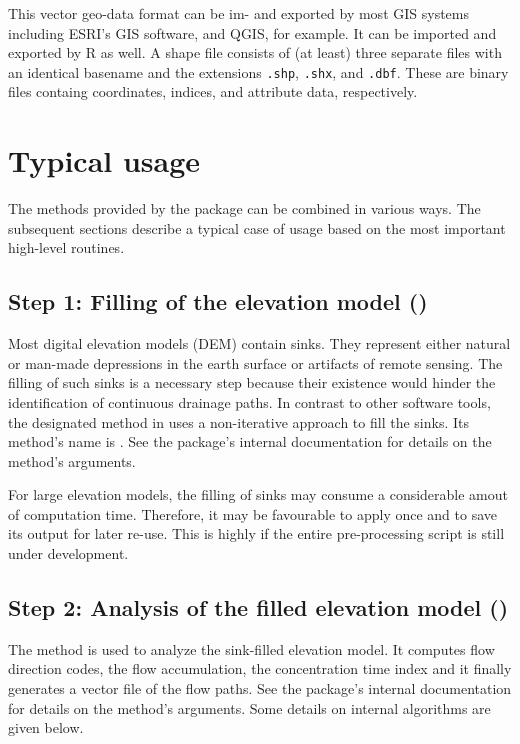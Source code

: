 This vector geo-data format can be im- and exported by most GIS systems including ESRI's GIS software, and QGIS, for example. It can be imported and exported by R as well. A shape file consists of (at least) three separate files with an identical basename and the extensions \texttt{.shp}, \texttt{.shx}, and \texttt{.dbf}. These are binary files containg coordinates, indices, and attribute data, respectively.

\section{Typical usage} \label{sec:topocatch:usage}

The methods provided by the  package can be combined in various ways. The subsequent sections describe a typical case of usage based on the most important high-level routines.

\subsection{Step 1: Filling of the elevation model ()}
Most digital elevation models (DEM) contain sinks. They represent either natural or man-made depressions in the earth surface or artifacts of remote sensing. The filling of such sinks is a necessary step because their existence would hinder the identification of continuous drainage paths. In contrast to other software tools, the designated method in  uses a non-iterative approach to fill the sinks. Its method's name is . See the package's internal documentation for details on the method's arguments.

For large elevation models, the filling of sinks may consume a considerable amout of computation time. Therefore, it may be favourable to apply  once and to save its output for later re-use. This is highly if the entire pre-processing script is still under development.

\subsection{Step 2: Analysis of the filled elevation model ()}
The method  is used to analyze the sink-filled elevation model. It computes flow direction codes, the flow accumulation, the concentration time index and it finally generates a vector file of the flow paths. See the package's internal documentation for details on the method's arguments. Some details on internal algorithms are given below.

